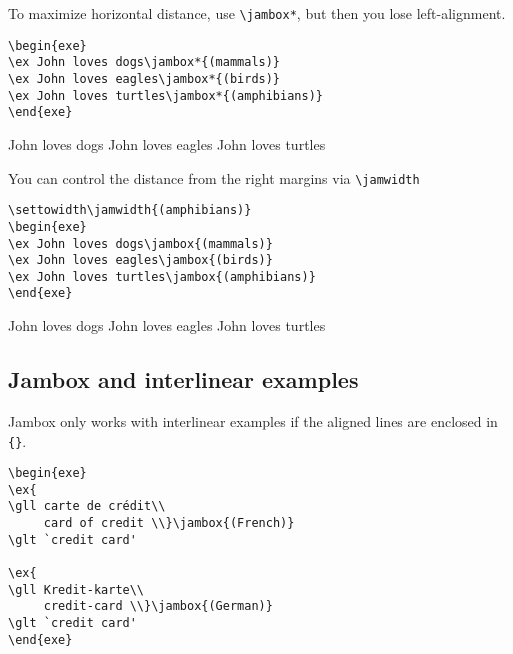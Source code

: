 \documentclass[output=paper]{langscibook}
\newcommand{\cmd}[1]{\texttt{\textbackslash#1}}
\begin{document}
To maximize horizontal distance, use \cmd{jambox*}, but then you lose left-alignment.

\begin{lstlisting} 
\begin{exe}
\ex John loves dogs\jambox*{(mammals)}
\ex John loves eagles\jambox*{(birds)}
\ex John loves turtles\jambox*{(amphibians)}   
\end{exe}
 \end{lstlisting}
 
\begin{exe}
\settowidth{}
\ex John loves dogs
\ex John loves eagles
\ex John loves turtles   
\end{exe}  


You can control the distance from the right margins via \cmd{jamwidth}

\begin{lstlisting}
\settowidth\jamwidth{(amphibians)}
\begin{exe}
\ex John loves dogs\jambox{(mammals)}
\ex John loves eagles\jambox{(birds)}
\ex John loves turtles\jambox{(amphibians)}   
\end{exe}
 \end{lstlisting}
 
\begin{exe}
\settowidth{}
\ex John loves dogs
\ex John loves eagles
\ex John loves turtles   
\end{exe}  


\subsection{Jambox and interlinear examples} 
Jambox only works with interlinear examples if the aligned lines are enclosed in \texttt{\{\}}. 

\begin{lstlisting}
\begin{exe} 
\ex{
\gll carte de crédit\\
     card of credit \\}\jambox{(French)}
\glt `credit card'

\ex{
\gll Kredit-karte\\
     credit-card \\}\jambox{(German)}
\glt `credit card'
\end{exe} 
 \end{lstlisting}
 
\end{document}
